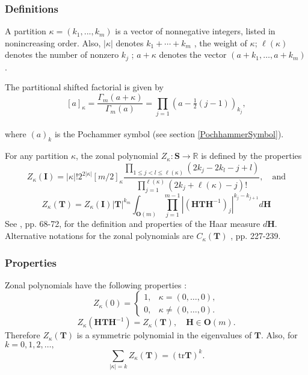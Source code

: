 \subsubsection{Definitions}
A partition $\kappa = (k_1 , . . . , k_m)$ is a vector of nonnegative integers, listed in nonincreasing order. Also, $|\kappa|$ denotes $k_1 + \cdots +k_m$ , the weight of $\kappa$; $\ell(\kappa)$ denotes the number of nonzero $k_j$ ; $a+\kappa$ denotes the vector $(a+k_1,\ldots, a+k_m )$.

The partitional shifted factorial is given by \citep{NIST}
\begin{equation}
	\left[a\right]_{\kappa} = \frac{\Gamma_m(a+\kappa)}{\Gamma_m(a)} = \prod_{j=1} \left(a-\tfrac{1}{2}(j-1) \right)_{k_j},
\end{equation} \\
where $(a)_k$ is the Pochammer symbol 
(see section \ref{PochhammerSymbol}).

For any partition $\kappa$, the zonal polynomial $Z_{\kappa} : \textbf{S} \rightarrow \mathbb{R}$ is defined by the properties \citep{NIST}
\begin{equation}
	Z_{\kappa}(\textbf{I}) = |\kappa|!2^{2|\kappa|} \left[m/2 \right]_{\kappa} \frac{\prod\limits_{1\leq j < l \leq \ell(\kappa)} (2k_j-2k_l-j+l)}{\prod\limits_{j=1}^{\ell(\kappa)} (2k_j+\ell(\kappa)-j)!}, \quad \text{and}
\end{equation} 
\begin{equation}
	Z_{\kappa}(\textbf{T}) = Z_{\kappa}(\textbf{I}) |\textbf{T}|^{k_m} \int_{\textbf{O}(m)} \prod_{j=1}^{m-1} |(\textbf{HTH}^{-1})_j|^{k_j-k_{j+1}} d\textbf{H}
\end{equation} 
See \cite{Muirhead_1982}, pp. 68-72, for the definition and properties of the Haar measure $d\textbf{H}$. Alternative notations for the zonal polynomials are $C_{\kappa}(\textbf{T})$ \cite{Muirhead_1982}, pp. 227-239.

\subsubsection{Properties}
Zonal polynomials have the following properties \citep{NIST}:
\begin{equation}
	Z_{\kappa}(0) = \begin{cases}
		1, & \kappa=(0,\ldots,0),\\
		0, & \kappa\neq(0,\ldots,0).
	\end{cases}
\end{equation} 
\begin{equation}
	Z_{\kappa}(\textbf{HTH}^{-1}) = Z_{\kappa}(\textbf{T}), \quad \textbf{H} \in \textbf{O}(m).
\end{equation} 
Therefore $Z_{\kappa}(\textbf{T})$ is a symmetric polynomial in the eigenvalues of $\textbf{T}$. Also, for $k=0,1,2,\ldots,$
\begin{equation}
	\sum_{|\kappa|=k} Z_{\kappa}(\textbf{T}) = (\text{tr}\textbf{T})^k.
\end{equation} 

